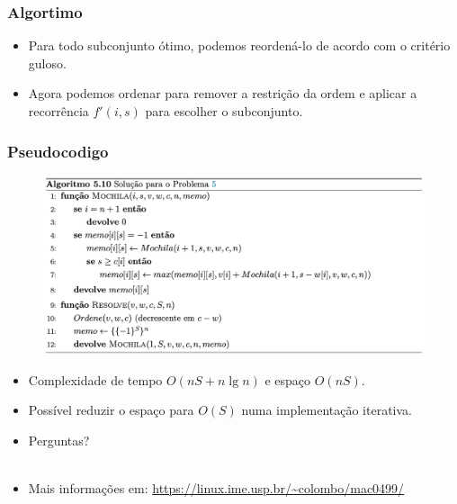 \documentclass{beamer}
\begin{document}

\begin{frame}
\frametitle{Algortimo}

\begin{itemize}
\item Para todo subconjunto ótimo, podemos reordená-lo de acordo com o critério guloso.
\item Agora podemos ordenar para remover a restrição da ordem e aplicar a recorrência $f'(i, s)$ para escolher o subconjunto.
\end{itemize}

\end{frame}


\begin{frame}
\frametitle{Pseudocodigo}

\begin{figure}
\includegraphics[width=0.8\linewidth]{pseudo.png}
\end{figure}
\begin{itemize}
  \item Complexidade de tempo $O(nS + n \lg n)$ e espaço $O(nS)$.
  \item Possível reduzir o espaço para $O(S)$ numa implementação iterativa. 
\end{itemize}

\end{frame}


\begin{frame}

\begin{itemize}
\item Perguntas?\\~\\
\item Mais informações em:
\url{https://linux.ime.usp.br/~colombo/mac0499/}
\end{itemize}

\end{frame}

\end{document}

